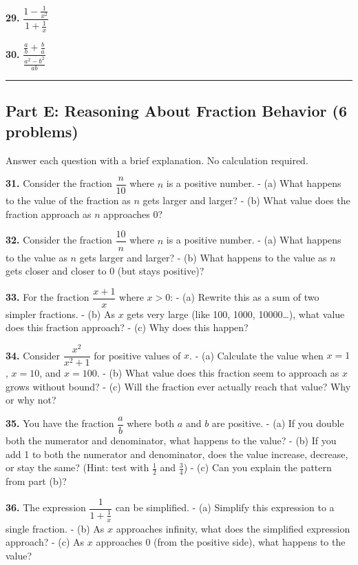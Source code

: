 \documentclass[
  11pt,
]{article}
\begin{document}
\textbf{29.} \(\dfrac{1 - \frac{1}{x^2}}{1 + \frac{1}{x}}\)

\textbf{30.} \(\dfrac{\frac{a}{b} + \frac{b}{a}}{\frac{a^2 - b^2}{ab}}\)

\begin{center}\rule{0.5\linewidth}{0.5pt}\end{center}

\hypertarget{part-e-reasoning-about-fraction-behavior-6-problems}{%
\subsection{Part E: Reasoning About Fraction Behavior (6
problems)}\label{part-e-reasoning-about-fraction-behavior-6-problems}}

Answer each question with a brief explanation. No calculation required.

\textbf{31.} Consider the fraction \(\dfrac{n}{10}\) where \(n\) is a
positive number. - (a) What happens to the value of the fraction as
\(n\) gets larger and larger? - (b) What value does the fraction
approach as \(n\) approaches 0?

\textbf{32.} Consider the fraction \(\dfrac{10}{n}\) where \(n\) is a
positive number. - (a) What happens to the value as \(n\) gets larger
and larger? - (b) What happens to the value as \(n\) gets closer and
closer to 0 (but stays positive)?

\textbf{33.} For the fraction \(\dfrac{x + 1}{x}\) where \(x > 0\): -
(a) Rewrite this as a sum of two simpler fractions. - (b) As \(x\) gets
very large (like 100, 1000, 10000\ldots), what value does this fraction
approach? - (c) Why does this happen?

\textbf{34.} Consider \(\dfrac{x^2}{x^2 + 1}\) for positive values of
\(x\). - (a) Calculate the value when \(x = 1\), \(x = 10\), and
\(x = 100\). - (b) What value does this fraction seem to approach as
\(x\) grows without bound? - (c) Will the fraction ever actually reach
that value? Why or why not?

\textbf{35.} You have the fraction \(\dfrac{a}{b}\) where both \(a\) and
\(b\) are positive. - (a) If you double both the numerator and
denominator, what happens to the value? - (b) If you add 1 to both the
numerator and denominator, does the value increase, decrease, or stay
the same? (Hint: test with \(\frac{1}{2}\) and \(\frac{3}{4}\)) - (c)
Can you explain the pattern from part (b)?

\textbf{36.} The expression \(\dfrac{1}{1 + \frac{1}{x}}\) can be
simplified. - (a) Simplify this expression to a single fraction. - (b)
As \(x\) approaches infinity, what does the simplified expression
approach? - (c) As \(x\) approaches 0 (from the positive side), what
happens to the value?
\end{document}
